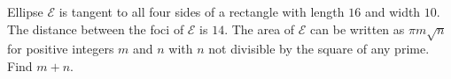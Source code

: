 Ellipse $\mathcal{E}$ is tangent to all four sides of a rectangle with length $16$ and width $10$. The distance between the foci of $\mathcal{E}$ is $14$. The area of $\mathcal{E}$ can be written as $\pi m\sqrt{n}$ for positive integers $m$ and $n$ with $n$ not divisible by the square of any prime. Find $m+n$.
